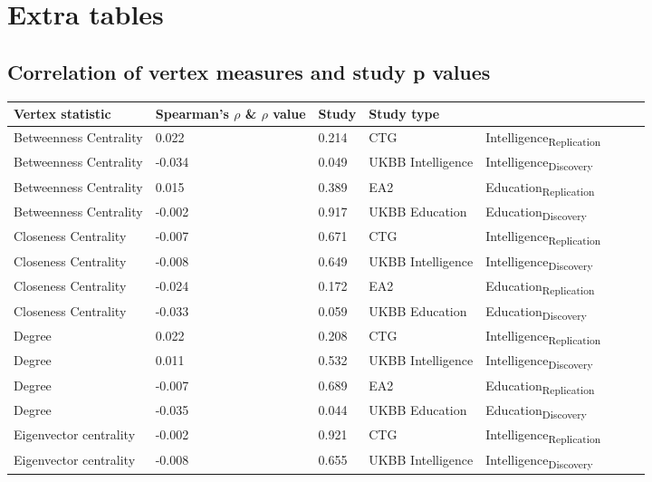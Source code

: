 \chapter{Extra tables}



\section{Correlation of vertex measures and study p values}

\begin{table}[h]{}
\centering

\begin{tabular}{llllllll}
Vertex statistic & Spearman's $\rho$ \& $\rho$ value & Study & Study type\\
\hline
Betweenness Centrality & 0.022 & 0.214 & CTG & Intelligence\textsubscript{Replication}\\
Betweenness Centrality & -0.034 & 0.049 & UKBB Intelligence & Intelligence\textsubscript{Discovery}\\
Betweenness Centrality & 0.015 & 0.389 & EA2 & Education\textsubscript{Replication}\\
Betweenness Centrality & -0.002 & 0.917 & UKBB Education & Education\textsubscript{Discovery}\\
Closeness Centrality & -0.007 & 0.671 & CTG & Intelligence\textsubscript{Replication}\\
Closeness Centrality & -0.008 & 0.649 & UKBB Intelligence & Intelligence\textsubscript{Discovery}\\
Closeness Centrality & -0.024 & 0.172 & EA2 & Education\textsubscript{Replication}\\
Closeness Centrality & -0.033 & 0.059 & UKBB Education & Education\textsubscript{Discovery}\\
Degree & 0.022 & 0.208 & CTG & Intelligence\textsubscript{Replication}\\
Degree & 0.011 & 0.532 & UKBB Intelligence & Intelligence\textsubscript{Discovery}\\
Degree & -0.007 & 0.689 & EA2 & Education\textsubscript{Replication}\\
Degree & -0.035 & 0.044 & UKBB Education & Education\textsubscript{Discovery}\\
Eigenvector centrality & -0.002 & 0.921 & CTG & Intelligence\textsubscript{Replication}\\
Eigenvector centrality & -0.008 & 0.655 & UKBB Intelligence & Intelligence\textsubscript{Discovery}\\

\end{tabular}
\end{table}
